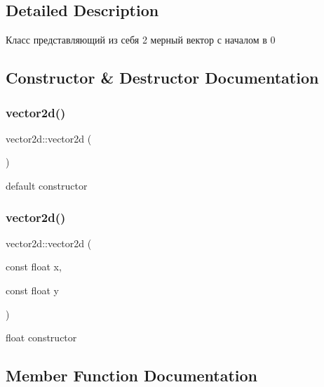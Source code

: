 \subsection{Detailed Description}
Класс представляющий из себя 2 мерный вектор с началом в 0 

\subsection{Constructor \& Destructor Documentation}
\mbox{\label{structvector2d_af134871b25c59bba456d251a45fac8ab}} 
\subsubsection{\texorpdfstring{vector2d()}{vector2d()}\hspace{0.1cm}{\footnotesize\ttfamily [1/2]}}
{\footnotesize\ttfamily vector2d\+::vector2d (\begin{DoxyParamCaption}{ }\end{DoxyParamCaption})\hspace{0.3cm}{\ttfamily [inline]}}



default constructor 

\mbox{\label{structvector2d_a7c01c4a257a4fbfe3fdbf233d60727fd}} 
\subsubsection{\texorpdfstring{vector2d()}{vector2d()}\hspace{0.1cm}{\footnotesize\ttfamily [2/2]}}
{\footnotesize\ttfamily vector2d\+::vector2d (\begin{DoxyParamCaption}\item[{const float}]{x,  }\item[{const float}]{y }\end{DoxyParamCaption})\hspace{0.3cm}{\ttfamily [inline]}}



float constructor 



\subsection{Member Function Documentation}
\mbox{\label{structvector2d_a39dea488ffb98d5f1a58eff85cddecb9}} 
